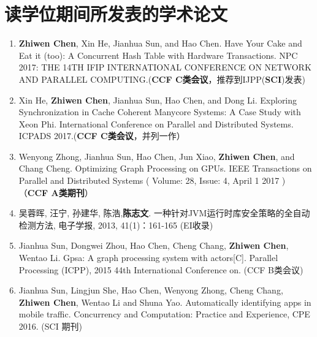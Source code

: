 \chapter{读学位期间所发表的学术论文}

\begin{enumerate}
\item \textbf{Zhiwen Chen}, Xin He, Jianhua Sun, and Hao Chen. Have Your Cake and Eat it (too): A Concurrent Hash Table with Hardware Transactions. NPC 2017: THE 14TH IFIP INTERNATIONAL CONFERENCE ON NETWORK AND PARALLEL COMPUTING.(\textbf{CCF C类会议}，推荐到IJPP(\textbf{SCI})发表)
\item Xin He, \textbf{Zhiwen Chen}, Jianhua Sun, Hao Chen, and Dong Li. Exploring Synchronization in Cache Coherent Manycore Systems: A Case Study with Xeon Phi. International Conference on Parallel and Distributed Systems. ICPADS 2017.(\textbf{CCF C类会议}，并列一作）
\item Wenyong Zhong, Jianhua Sun, Hao Chen, Jun Xiao, \textbf{Zhiwen Chen}, and Chang Cheng. Optimizing Graph Processing on GPUs. IEEE Transactions on Parallel and Distributed Systems ( Volume: 28, Issue: 4, April 1 2017 ) （\textbf{CCF A类期刊}）
\item 吴蓉晖, 汪宁, 孙建华, 陈浩,\textbf{陈志文}. 一种针对JVM运行时库安全策略的全自动检测方法, 电子学报, 2013, 41(1)：161-165 (EI收录)
\item Jianhua Sun, Dongwei Zhou, Hao Chen, Cheng Chang, \textbf{Zhiwen Chen}, Wentao Li. Gpsa: A graph processing system with actors[C]. Parallel Processing (ICPP), 2015 44th International Conference on. (CCF B类会议)
 \item Jianhua Sun, Lingjun She, Hao Chen, Wenyong Zhong, Cheng Chang, \textbf{Zhiwen Chen}, Wentao Li and Shuna Yao. Automatically identifying apps in mobile traffic. Concurrency and Computation: Practice and Experience, CPE 2016. (SCI 期刊)
\end{enumerate}



